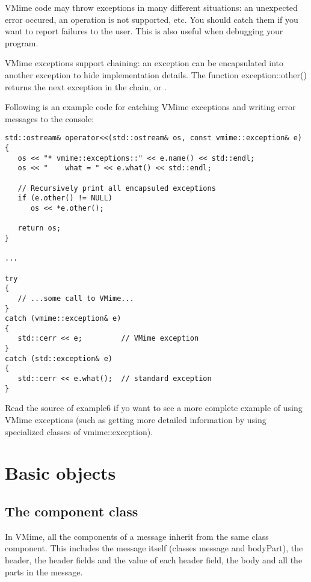 VMime code may throw exceptions in many different situations: an unexpected
error occured, an operation is not supported, etc. You should catch them if
you want to report failures to the user. This is also useful when debugging
your program.

VMime exceptions support chaining: an exception can be encapsulated into
another exception to hide implementation details. The function
{\vcode exception::other()} returns the next exception in the chain,
or \vnull.

Following is an example code for catching VMime exceptions and writing error
messages to the console:

\begin{lstlisting}[caption={Catching VMime exceptions}]
std::ostream& operator<<(std::ostream& os, const vmime::exception& e)
{
   os << "* vmime::exceptions::" << e.name() << std::endl;
   os << "    what = " << e.what() << std::endl;

   // Recursively print all encapsuled exceptions
   if (e.other() != NULL)
      os << *e.other();

   return os;
}

...

try
{
   // ...some call to VMime...
}
catch (vmime::exception& e)
{
   std::cerr << e;         // VMime exception
}
catch (std::exception& e)
{
   std::cerr << e.what();  // standard exception
}
\end{lstlisting}

Read the source of {\vexample example6} if yo want to see a more complete
example of using VMime exceptions (such as getting more detailed information
by using specialized classes of {\vcode vmime::exception}).


\section{Basic objects}

\subsection{The {\vcode component} class} %

In VMime, all the components of a message inherit from the same class
{\vcode component}. This includes the message itself (classes {\vcode message}
and {\vcode bodyPart}), the header, the header fields and the value of each
header field, the body and all the parts in the message.


